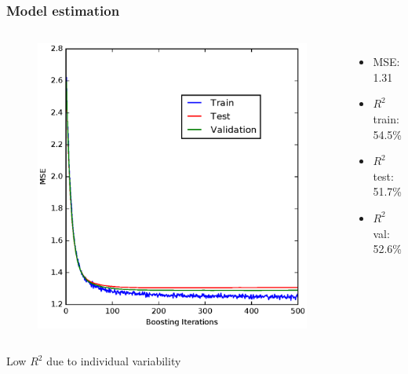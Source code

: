 \documentclass{beamer}
\begin{document}

\begin{frame}
\frametitle{Model estimation}
    \vspace{-1cm}
\begin{columns}[c]    
    \centering
\begin{figure}
\includegraphics[scale=0.55]{../fig/devianceCS-present}
\end{figure}
  \centering
  \begin{itemize}
      \item MSE: 1.31
      \item $R^2$ train: 54.5\%
      \item $R^2$ test: 51.7\%
      \item $R^2$ val: 52.6\%
  \end{itemize}
\end{columns}
\centering Low $R^2$ due to individual variability 
\end{frame}

\end{document}
